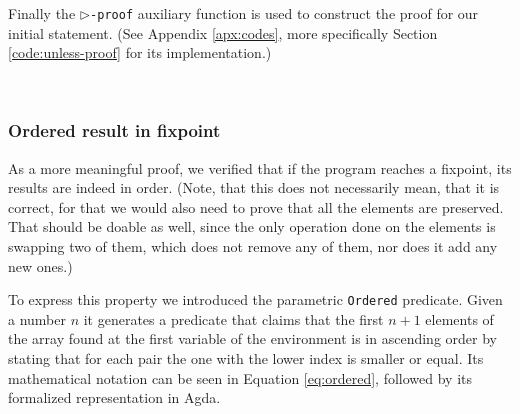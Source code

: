 Finally the \texttt{$\rhd$-proof} auxiliary function is used to construct the proof for our initial statement. (See Appendix \ref{apx:codes}, more specifically Section \ref{code:unless-proof} for its implementation.)

\begin{code}
    \>[0]\AgdaSpace{}%
    \AgdaSymbol{:}\AgdaSpace{}%
    \AgdaSymbol{(}\AgdaSpace{}%
    \AgdaSymbol{:}\AgdaSpace{}%
    \AgdaSymbol{)}\AgdaSpace{}%
    \AgdaSpace{}%
    \AgdaSpace{}%
    \AgdaOperator{\AgdaFunction{▷[}}\AgdaSpace{}%
    \AgdaSpace{}%
    \AgdaSpace{}%
    \AgdaOperator{\AgdaFunction{]}}\AgdaSpace{}%
    \<%
    \\
    \>[0]\AgdaSpace{}%
    \AgdaSpace{}%
    \AgdaSymbol{\{}\AgdaSymbol{\}}\AgdaSpace{}%
    \AgdaSymbol{=}\AgdaSpace{}%
    \AgdaSpace{}%
    \AgdaSymbol{\{}\AgdaSymbol{\}}\AgdaSpace{}%
    \AgdaSymbol{\{}\AgdaSymbol{\}}\AgdaSpace{}%
    \AgdaSymbol{(}\AgdaSpace{}%
    \AgdaSymbol{)}\<%
\end{code}


\subsubsection{Ordered result in fixpoint}

As a more meaningful proof, we verified that if the program reaches a fixpoint, its results are indeed in order. (Note, that this does not necessarily mean, that it is correct, for that we would also need to prove that all the elements are preserved. That should be doable as well, since the only operation done on the elements is swapping two of them, which does not remove any of them, nor does it add any new ones.)

To express this property we introduced the parametric \verb|Ordered| predicate. Given a number $n$ it generates a predicate that claims that the first $n + 1$ elements of the array found at the first variable of the environment is in ascending order by stating that for each pair the one with the lower index is smaller or equal. Its mathematical notation can be seen in Equation \ref{eq:ordered}, followed by its formalized representation in Agda.

